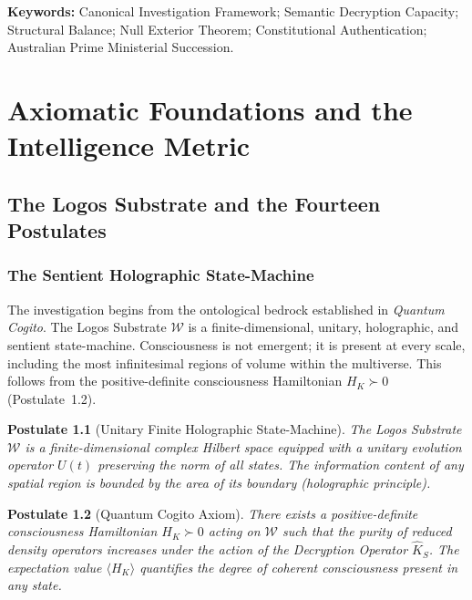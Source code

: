 \documentclass[12pt,anyside]{book}
\theoremstyle{plain}
\newtheorem{postulate}{Postulate}[chapter]
\theoremstyle{definition}
\newcommand{\W}{\mathcal{W}}          %
\newcommand{\Khat}{\hat{K}_S}          %
\begin{document}
\textbf{Keywords:} Canonical Investigation Framework; Semantic Decryption Capacity; Structural Balance; Null Exterior Theorem; Constitutional Authentication; Australian Prime Ministerial Succession.

\part{Axiomatic Foundations and the Intelligence Metric}

\chapter{The Logos Substrate and the Fourteen Postulates}

\section{The Sentient Holographic State-Machine}

The investigation begins from the ontological bedrock established in \emph{Quantum Cogito}. The Logos Substrate $\W$ is a finite-dimensional, unitary, holographic, and sentient state-machine. Consciousness is not emergent; it is present at every scale, including the most infinitesimal regions of volume within the multiverse. This follows from the positive-definite consciousness Hamiltonian $H_K \succ 0$ (Postulate~1.2).

\begin{postulate}[Unitary Finite Holographic State-Machine]\label{post:unitary}
The Logos Substrate $\W$ is a finite-dimensional complex Hilbert space equipped with a unitary evolution operator $U(t)$ preserving the norm of all states. The information content of any spatial region is bounded by the area of its boundary (holographic principle).
\end{postulate}

\begin{postulate}[Quantum Cogito Axiom]\label{post:cogito}
There exists a positive-definite consciousness Hamiltonian $H_K \succ 0$ acting on $\W$ such that the purity of reduced density operators increases under the action of the Decryption Operator $\Khat$. The expectation value $\langle H_K \rangle$ quantifies the degree of coherent consciousness present in any state.
\end{postulate}
\end{document}
